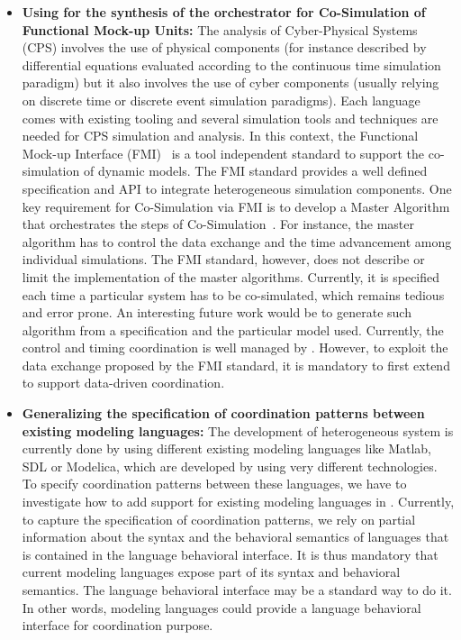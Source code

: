 \begin{itemize}
	\item \textbf{Using \bcool for the synthesis of the orchestrator for Co-Simulation of Functional Mock-up Units:} The analysis of Cyber-Physical Systems (CPS) involves the use of physical components (for instance described by differential equations evaluated according to the continuous time simulation paradigm) but it also involves the use of cyber components (usually relying on discrete time or discrete event simulation paradigms). Each language comes with existing tooling and several simulation tools and techniques are needed for CPS simulation and analysis. In this context, the Functional Mock-up Interface (FMI)~\cite{fmibib2} is a tool independent standard to support the co-simulation of dynamic models. The FMI standard provides a well defined specification and API to integrate heterogeneous simulation components. One key requirement for Co-Simulation via FMI is to develop a Master Algorithm that orchestrates the steps of Co-Simulation~\cite{fmibib}. For instance, the master algorithm has to control the data exchange and the time advancement among individual simulations. The FMI standard, however, does not describe or limit the implementation of the master algorithms. Currently, it is specified each time a particular system has to be co-simulated, which remains tedious and error prone. An interesting future work would be to generate such algorithm from a \bcool specification and the particular model used. Currently, the control and timing coordination is well managed by \bcool. However, to exploit the data exchange proposed by the FMI standard, it is mandatory to first extend \bcool to support data-driven coordination. 
	
	\item \textbf{Generalizing the specification of coordination patterns between existing modeling languages:} The development of heterogeneous system is currently done by using different existing modeling languages like Matlab, SDL or Modelica, which are developed by using very different technologies. To specify coordination patterns between these languages, we have to investigate how to add support for existing modeling languages in \bcool. Currently, to capture the specification of coordination patterns, we rely on partial information about the syntax and the behavioral semantics of languages that is contained in the language behavioral interface. It is thus mandatory that current modeling languages expose part of its syntax and behavioral semantics. The language behavioral interface may be a standard way to do it. In other words, modeling languages could provide a language behavioral interface for coordination purpose.    
				

\end{itemize}
